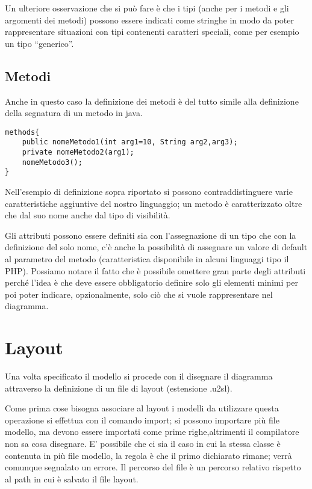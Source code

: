 Un ulteriore osservazione che si può fare è che i tipi (anche per i metodi e gli 
argomenti dei metodi) possono essere indicati come stringhe in modo da poter 
rappresentare situazioni con tipi contenenti caratteri speciali, come per esempio
un tipo ``generico''.

\subsection{Metodi}

Anche in questo caso la definizione dei metodi è del tutto simile alla
definizione della segnatura di un metodo in java.

\begin{lstlisting}[caption={Dichiarazione di metodi}, style={model}]
methods{
	public nomeMetodo1(int arg1=10, String arg2,arg3);
	private nomeMetodo2(arg1);
	nomeMetodo3();
}
\end{lstlisting}

Nell'esempio di definizione sopra riportato si possono contraddistinguere varie 
caratteristiche aggiuntive del nostro linguaggio; un metodo è caratterizzato
oltre che dal suo nome anche dal tipo di visibilità.

Gli attributi possono essere definiti sia con l'assegnazione di un tipo che con
la definizione del solo nome, c'è anche la possibilità di assegnare un valore di
default al parametro del metodo (caratteristica disponibile in alcuni linguaggi
tipo il PHP).
Possiamo notare il fatto che è possibile omettere gran parte degli attributi
perché l'idea è che deve essere obbligatorio definire solo gli elementi minimi
per poi poter indicare, opzionalmente, solo ciò che si vuole rappresentare nel
diagramma. 


\section{Layout}


Una volta specificato il modello si procede con il disegnare il diagramma
attraverso la definizione di un file di layout (estensione .u2sl).

Come prima cose bisogna associare al layout i modelli da utilizzare questa
operazione si effettua con il comando import; si possono importare più file
modello, ma devono essere importati come prime righe,altrimenti il compilatore
non sa cosa disegnare. E' possibile che ci sia il caso in cui la stessa classe è
contenuta in più file modello, la regola è che il primo dichiarato rimane; verrà
comunque segnalato un errore. Il percorso del file è un percorso relativo
rispetto al path in cui è salvato il file layout.

